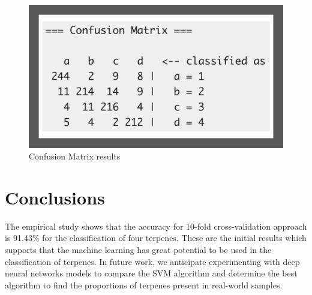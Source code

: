 \documentclass[12pt, a4paper]{article}
\begin{document}
\begin{figure}[!ht]
\centering
    \begin{center}
        \includegraphics[width = 9 cm]{confusionMatrixforGSS2020.png}
    \end{center}
    \caption{Confusion Matrix results}
    \label{fig:confMat}
\end{figure}

\section{Conclusions}
The empirical study shows that the accuracy for 10-fold cross-validation approach is 91.43\% for the classification of four terpenes. These are the initial results which supports that the machine learning has great potential to be used in the classification of terpenes. In future work, we anticipate experimenting with deep neural networks models to compare the SVM algorithm \cite{Cortes1995} and determine the best algorithm to find the proportions of terpenes present in real-world samples.

\newpage
 



 
\clearpage




\printglossary[nonumberlist]
 
\end{document}
